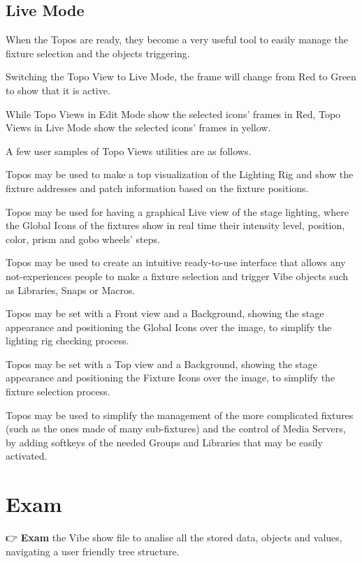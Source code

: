 \documentclass[
]{article}
\begin{document}
\hypertarget{Live-Mode-15.6}{%
\subsection{Live Mode}\label{Live-Mode-15.6}}

When the Topos are ready, they become a very useful tool to easily manage the fixture selection and the objects triggering.

Switching the Topo View to Live Mode, the frame will change from Red to Green to show that it is active.

While Topo Views in Edit Mode show the selected icons' frames in Red, Topo Views in Live Mode show the selected icons' frames in yellow.

A few user samples of Topo Views utilities are as follows.

Topos may be used to make a top visualization of the Lighting Rig and show the fixture addresses and patch information based on the fixture positions.

Topos may be used for having a graphical Live view of the stage lighting, where the Global Icons of the fixtures show in real time their intensity level, position, color, prism and gobo wheels' steps.

Topos may be used to create an intuitive ready-to-use interface that allows any not-experiences people to make a fixture selection and trigger Vibe objects such as Libraries, Snaps or Macros.

Topos may be set with a Front view and a Background, showing the stage appearance and positioning the Global Icons over the image, to simplify the lighting rig checking process.

Topos may be set with a Top view and a Background, showing the stage appearance and positioning the Fixture Icons over the image, to simplify the fixture selection process.

Topos may be used to simplify the management of the more complicated fixtures (such as the ones made of many sub-fixtures) and the control of Media Servers, by adding softkeys of the needed Groups and Libraries that may be easily activated.

\hypertarget{exam}{%
\section{Exam}\label{exam}}

👉 \textbf{Exam} the Vibe show file to analise all the stored data, objects and values, navigating a user friendly tree structure.
\end{document}
